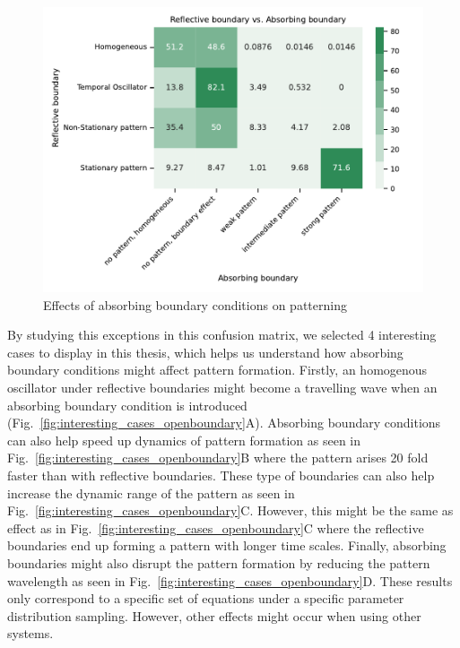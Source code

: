 \begin{figure}[H] %
    \centering
    \begin{adjustbox}{center}
        \includegraphics[width=1\textwidth]{chapters/Chapter 1/nogrowth_openboundary_confusion_variant0-11-12} %
    \end{adjustbox}
    \caption{Effects of absorbing boundary conditions on patterning}
    \label{fig:nogrowth_openboundary_confusion_variant0} %
\end{figure}

By studying this exceptions in this confusion matrix, we selected 4 interesting cases to display in this thesis, which helps us understand how absorbing boundary conditions might affect pattern formation.
Firstly, an homogenous oscillator under reflective boundaries might become a travelling wave when an absorbing boundary condition is introduced (Fig.~\ref{fig:interesting_cases_openboundary}A).
Absorbing boundary conditions can also help speed up dynamics of pattern formation as seen in Fig.~\ref{fig:interesting_cases_openboundary}B where the pattern arises 20 fold faster than with reflective boundaries.
These type of boundaries can also help increase the dynamic range of the pattern as seen in Fig.~\ref{fig:interesting_cases_openboundary}C.
However, this might be the same as effect as in Fig.~\ref{fig:interesting_cases_openboundary}C where the reflective boundaries end up forming a pattern with longer time scales.
Finally, absorbing boundaries might also disrupt the pattern formation by reducing the pattern wavelength as seen in Fig.~\ref{fig:interesting_cases_openboundary}D.
These results only correspond to a specific set of equations under a specific parameter distribution sampling.
However, other effects might occur when using other systems.

